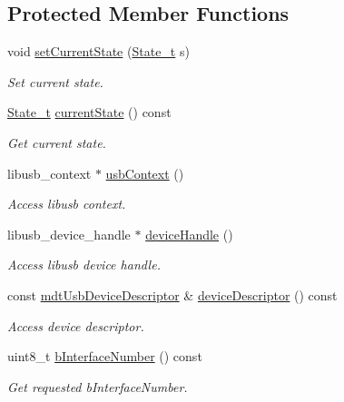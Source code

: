 \subsection*{Protected Member Functions}
\begin{DoxyCompactItemize}
\item 
void \hyperlink{classmdt_usb_port_thread_new_af22a52225631aa41b234dfd86463a041}{set\-Current\-State} (\hyperlink{classmdt_usb_port_thread_new_acff06a201f3949a442ee854e45176de9}{State\-\_\-t} s)
\begin{DoxyCompactList}\small\item\em Set current state. \end{DoxyCompactList}\item 
\hyperlink{classmdt_usb_port_thread_new_acff06a201f3949a442ee854e45176de9}{State\-\_\-t} \hyperlink{classmdt_usb_port_thread_new_a125c41214479178928c74359c12ecac7}{current\-State} () const 
\begin{DoxyCompactList}\small\item\em Get current state. \end{DoxyCompactList}\item 
libusb\-\_\-context $\ast$ \hyperlink{classmdt_usb_port_thread_new_a236b21eb4da1bfb1918c2d30afc85ef5}{usb\-Context} ()
\begin{DoxyCompactList}\small\item\em Access libusb context. \end{DoxyCompactList}\item 
libusb\-\_\-device\-\_\-handle $\ast$ \hyperlink{classmdt_usb_port_thread_new_aff9e3c87c9693fc191ac323bc8acd670}{device\-Handle} ()
\begin{DoxyCompactList}\small\item\em Access libusb device handle. \end{DoxyCompactList}\item 
const \hyperlink{classmdt_usb_device_descriptor}{mdt\-Usb\-Device\-Descriptor} \& \hyperlink{classmdt_usb_port_thread_new_a26e376f505b24f796e485361b4f36740}{device\-Descriptor} () const 
\begin{DoxyCompactList}\small\item\em Access device descriptor. \end{DoxyCompactList}\item 
uint8\-\_\-t \hyperlink{classmdt_usb_port_thread_new_a473cc8ad9fa93d9c5a94b2f700a5311d}{b\-Interface\-Number} () const 
\begin{DoxyCompactList}\small\item\em Get requested b\-Interface\-Number. \end{DoxyCompactList}\item 

\end{DoxyCompactItemize}
